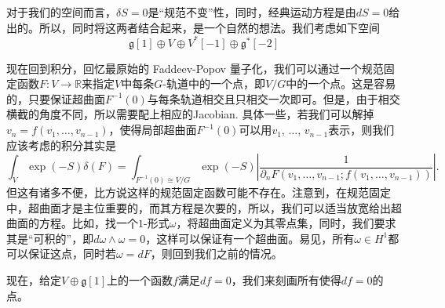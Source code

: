 \documentclass[11pt]{article}
\theoremstyle{definition}
\theoremstyle{plain}
\begin{document}
对于我们的空间而言，$\delta S=0$是“规范不变”性，同时，经典运动方程是由$dS=0$给出的。所以，同时将这两者结合起来，是一个自然的想法。我们考虑如下空间
\[
    \mathfrak g[1]\oplus V\oplus V^*[-1]\oplus \mathfrak g^*[-2]
\]

现在回到积分，回忆最原始的 Faddeev-Popov 量子化，我们可以通过一个规范固定函数$F:V\to \mathbb R$来指定$V$中每条$G$-轨道中的一个点，即$V/G$中的一个点。这是容易的，只要保证超曲面$F^{-1}(0)$与每条轨道相交且只相交一次即可。但是，由于相交横截的角度不同，所以需要配上相应的Jacobian. 具体一些，若我们可以解掉$v_n=f(v_1,\dots,v_{n-1})$，使得局部超曲面$F^{-1}(0)$可以用$v_1$, $\dots$, $v_{n-1}$表示，则我们应该考虑的积分其实是
\[
    \int_{V} \exp(-S)\delta(F)=\int_{F^{-1}(0)\cong V/G} \exp(-S)\left|\frac{1}{\partial_nF(v_1,\dots,v_{n-1};f(v_1,\dots,v_{n-1}))}\right|.
\]
但这有诸多不便，比方说这样的规范固定函数可能不存在。注意到，在规范固定中，超曲面才是主位重要的，而其方程是次要的，所以，我们可以适当放宽给出超曲面的方程。比如，找一个$1$-形式$\omega$，将超曲面定义为其零点集，同时，我们要求其是“可积的”，即$d\omega\wedge \omega=0$，这样可以保证有一个超曲面。易见，所有$\omega\in H^1$都可以保证这点，同时若$\omega=dF$，则回到我们之前的情况。

现在，给定$V\oplus \mathfrak g[1]$上的一个函数$f$满足$df=0$，我们来刻画所有使得$df=0$的点。
\end{document}
